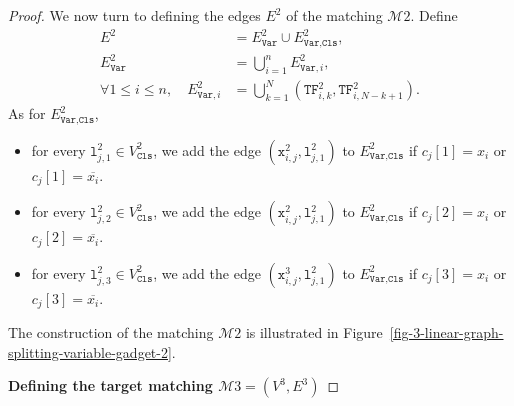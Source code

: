 \begin{proof}
    We now turn to defining the edges $E^{2}$ of the matching $\mathcal{M}{2}$.
    Define
    \begin{align*}
      E^{2} &= E^{2}_{\texttt{Var}} \cup E^{2}_{\texttt{Var},\texttt{Cls}},
      \\
      E^{2}_{\texttt{Var}} &= \bigcup_{i=1}^{n} E^{2}_{\texttt{Var}, i},
      \\
      \forall 1\leq i \leq n,\quad
      E^{2}_{\texttt{Var}, i} &= \bigcup_{k=1}^{N} (\texttt{TF}^{2}_{i,k}, \texttt{TF}^{2}_{i,N-k+1})\text{.}
    \end{align*}
    As for $E^{2}_{\texttt{Var},\texttt{Cls}}$,
    \begin{itemize}
      \item
      for every $\texttt{l}^{2}_{j, 1} \in V^{2}_{\texttt{Cls}}$,
      we add
      the edge $(\texttt{x}^{2}_{i,j}, \texttt{l}^{2}_{j, 1})$
      to $E^{2}_{\texttt{Var},\texttt{Cls}}$
      if $c_{j}[1] = x_{i}$ or $c_{j}[1] = \overline{x_{i}}$.
      \item
      for every $\texttt{l}^{2}_{j, 2} \in V^{2}_{\texttt{Cls}}$,
      we add
      the edge $(\texttt{x}^{2}_{i,j}, \texttt{l}^{2}_{j, 1})$
      to $E^{2}_{\texttt{Var},\texttt{Cls}}$
      if $c_{j}[2] = x_{i}$ or $c_{j}[2] = \overline{x_{i}}$.
      \item
      for every $\texttt{l}^{2}_{j, 3} \in V^{2}_{\texttt{Cls}}$,
      we add
      the edge $(\texttt{x}^{3}_{i,j}, \texttt{l}^{2}_{j, 1})$
      to $E^{2}_{\texttt{Var},\texttt{Cls}}$
      if $c_{j}[3] = x_{i}$ or $c_{j}[3] = \overline{x_{i}}$.
    \end{itemize}

  The construction of the matching $\mathcal{M}{2}$ is illustrated
  in Figure~\ref{fig-3-linear-graph-splitting-variable-gadget-2}.

  

  \medskip
  \textbf{Defining the target matching $\mathcal{M}{3} = (V^{3}, E^{3})$}
  \medskip


\end{proof}
